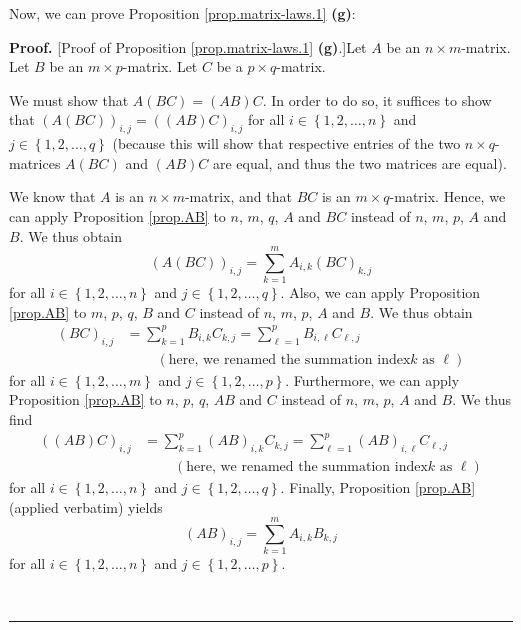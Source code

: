 \documentclass[numbers=enddot,12pt,final,onecolumn,notitlepage]{scrartcl}%
\theoremstyle{definition}
\newenvironment{proof}[1][Proof]{\noindent\textbf{#1.} }{\ \rule{0.5em}{0.5em}}
\let\sumnonlimits\sum
\renewcommand{\sum}{\sumnonlimits\limits}
\begin{document}
Now, we can prove Proposition \ref{prop.matrix-laws.1} \textbf{(g)}:

\begin{proof}
[Proof of Proposition \ref{prop.matrix-laws.1} \textbf{(g)}.]Let $A$ be an
$n\times m$-matrix. Let $B$ be an $m\times p$-matrix. Let $C$ be a $p\times q$-matrix.

We must show that $A\left(  BC\right)  =\left(  AB\right)  C$. In order to do
so, it suffices to show that $\left(  A\left(  BC\right)  \right)
_{i,j}=\left(  \left(  AB\right)  C\right)  _{i,j}$ for all $i\in\left\{
1,2,\ldots,n\right\}  $ and $j\in\left\{  1,2,\ldots,q\right\}  $ (because
this will show that respective entries of the two $n\times q$-matrices
$A\left(  BC\right)  $ and $\left(  AB\right)  C$ are equal, and thus the two
matrices are equal).

We know that $A$ is an $n\times m$-matrix, and that $BC$ is an $m\times
q$-matrix. Hence, we can apply Proposition \ref{prop.AB} to $n$, $m$, $q$, $A$
and $BC$ instead of $n$, $m$, $p$, $A$ and $B$. We thus obtain%
\begin{equation}
\left(  A\left(  BC\right)  \right)  _{i,j}=\sum_{k=1}^{m}A_{i,k}\left(
BC\right)  _{k,j} \label{pf.prop.matrix-laws.1.g.A(BC)}%
\end{equation}
for all $i\in\left\{  1,2,\ldots,n\right\}  $ and $j\in\left\{  1,2,\ldots
,q\right\}  $. Also, we can apply Proposition \ref{prop.AB} to $m$, $p$, $q$,
$B$ and $C$ instead of $n$, $m$, $p$, $A$ and $B$. We thus obtain%
\begin{align}
\left(  BC\right)  _{i,j}  &  =\sum_{k=1}^{p}B_{i,k}C_{k,j}=\sum_{\ell=1}%
^{p}B_{i,\ell}C_{\ell,j}\label{pf.prop.matrix-laws.1.g.BC}\\
&  \ \ \ \ \ \ \ \ \ \ \left(  \text{here, we renamed the summation index
}k\text{ as }\ell\right) \nonumber
\end{align}
for all $i\in\left\{  1,2,\ldots,m\right\}  $ and $j\in\left\{  1,2,\ldots
,p\right\}  $. Furthermore, we can apply Proposition \ref{prop.AB} to $n$,
$p$, $q$, $AB$ and $C$ instead of $n$, $m$, $p$, $A$ and $B$. We thus find%
\begin{align}
\left(  \left(  AB\right)  C\right)  _{i,j}  &  =\sum_{k=1}^{p}\left(
AB\right)  _{i,k}C_{k,j}=\sum_{\ell=1}^{p}\left(  AB\right)  _{i,\ell}%
C_{\ell,j}\label{pf.prop.matrix-laws.1.g.(AB)C}\\
&  \ \ \ \ \ \ \ \ \ \ \left(  \text{here, we renamed the summation index
}k\text{ as }\ell\right) \nonumber
\end{align}
for all $i\in\left\{  1,2,\ldots,n\right\}  $ and $j\in\left\{  1,2,\ldots
,q\right\}  $. Finally, Proposition \ref{prop.AB} (applied verbatim) yields%
\begin{equation}
\left(  AB\right)  _{i,j}=\sum_{k=1}^{m}A_{i,k}B_{k,j}
\label{pf.prop.matrix-laws.1.g.AB}%
\end{equation}
for all $i\in\left\{  1,2,\ldots,n\right\}  $ and $j\in\left\{  1,2,\ldots
,p\right\}  $.


\end{proof}
\end{document}
